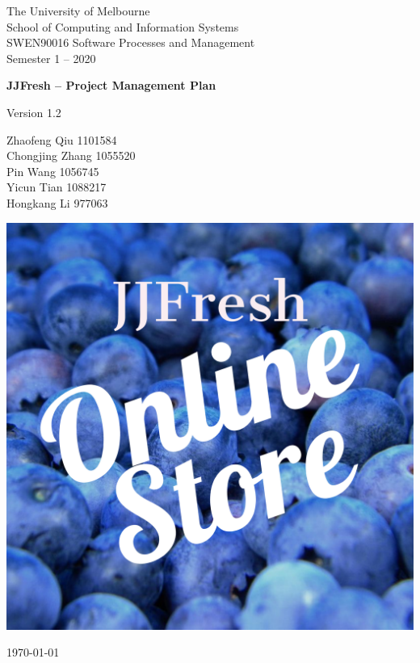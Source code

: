 \documentclass{report}
\begin{document}
\begin{titlepage}
	\clearpage\thispagestyle{empty}
	\centering
	\vspace{1cm}

	{\normalsize The University of Melbourne \\ 
		School of Computing and Information Systems \\
		SWEN90016 Software Processes and Management\\
		Semester 1 – 2020 \par}
	\vspace{3cm}

	{\Huge \textbf{JJFresh -- Project Management Plan}} \\
  \vspace{0.5cm}
	{\normalsize Version 1.2 \par}
	\vspace{2.5cm}
	{\normalsize Zhaofeng Qiu 1101584\\ %
	             Chongjing Zhang 1055520\\
	             Pin Wang 1056745 \\
	             Yicun Tian 1088217 \\
	             Hongkang Li 977063\par}
	\vspace{3cm}
    
  \centering \includegraphics[scale=0.12]{logo.pdf}
  
  \vspace{0.5cm}
		
	{\normalsize \today \par}
	\pagebreak
\end{titlepage}
\end{document}

